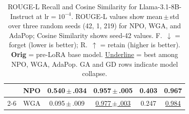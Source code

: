 \begin{table}[ht]
\begin{tabularx}{\linewidth}{|l|>{\centering\arraybackslash}X|c|c|c|c|}
\rowcolor{gray!10} \cellcolor{white} & NPO & 0.540{\tiny\,$\pm$\,.034} & 0.957{\tiny\,$\pm$\,.005} & 0.403 & 0.967 \\ \cline{2-6}
\multirow{-6}{*}{\textbf{RWKU}} \cellcolor{white} & WGA & 0.095{\tiny\,$\pm$\,.009} & \underline{0.977{\tiny\,$\pm$\,.003}} & 0.247 & \underline{0.984} \\ \hline
\end{tabularx}
\caption{ROUGE-L Recall and Cosine Similarity for Llama-3.1-8B-Instruct at $\text{lr}=10^{-4}$. ROUGE-L values show mean\,$\pm$\,std over three random seeds (42, 1, 219) for NPO, WGA, and AdaPop; Cosine Similarity shows seed-42 values. F.~$\downarrow$ = forget (lower is better); R.~$\uparrow$ = retain (higher is better). \textbf{Orig} = pre-LoRA base model. \underline{Underline} = best among NPO, WGA, AdaPop. GA and GD rows indicate model collapse.}
\label{tab:rouge-llama}
\end{table}

